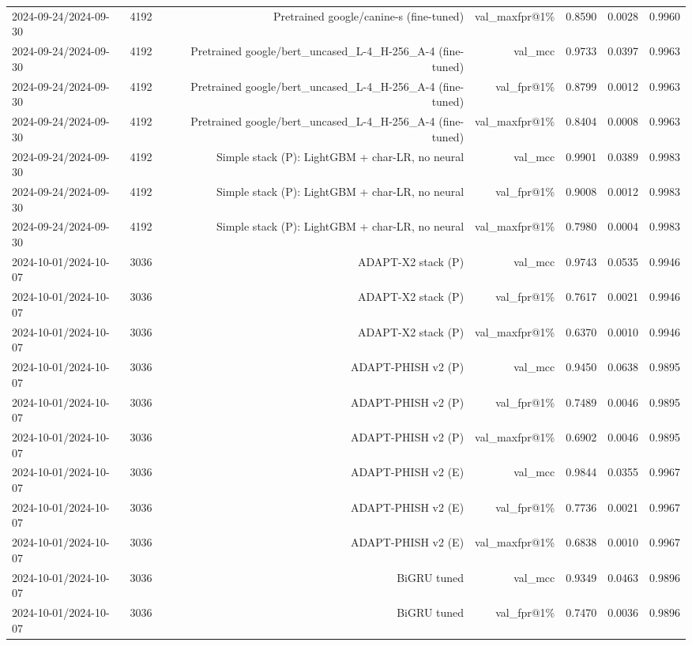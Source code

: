 \begin{table}[t]
\begin{tabular}{llrrrrr}
2024-09-24/2024-09-30 & 4192 & Pretrained google/canine-s (fine-tuned) & val\_maxfpr@1\% & 0.8590 & 0.0028 & 0.9960 \\
2024-09-24/2024-09-30 & 4192 & Pretrained google/bert\_uncased\_L-4\_H-256\_A-4 (fine-tuned) & val\_mcc & 0.9733 & 0.0397 & 0.9963 \\
2024-09-24/2024-09-30 & 4192 & Pretrained google/bert\_uncased\_L-4\_H-256\_A-4 (fine-tuned) & val\_fpr@1\% & 0.8799 & 0.0012 & 0.9963 \\
2024-09-24/2024-09-30 & 4192 & Pretrained google/bert\_uncased\_L-4\_H-256\_A-4 (fine-tuned) & val\_maxfpr@1\% & 0.8404 & 0.0008 & 0.9963 \\
2024-09-24/2024-09-30 & 4192 & Simple stack (P): LightGBM + char-LR, no neural & val\_mcc & 0.9901 & 0.0389 & 0.9983 \\
2024-09-24/2024-09-30 & 4192 & Simple stack (P): LightGBM + char-LR, no neural & val\_fpr@1\% & 0.9008 & 0.0012 & 0.9983 \\
2024-09-24/2024-09-30 & 4192 & Simple stack (P): LightGBM + char-LR, no neural & val\_maxfpr@1\% & 0.7980 & 0.0004 & 0.9983 \\
2024-10-01/2024-10-07 & 3036 & ADAPT-X2 stack (P) & val\_mcc & 0.9743 & 0.0535 & 0.9946 \\
2024-10-01/2024-10-07 & 3036 & ADAPT-X2 stack (P) & val\_fpr@1\% & 0.7617 & 0.0021 & 0.9946 \\
2024-10-01/2024-10-07 & 3036 & ADAPT-X2 stack (P) & val\_maxfpr@1\% & 0.6370 & 0.0010 & 0.9946 \\
2024-10-01/2024-10-07 & 3036 & ADAPT-PHISH v2 (P) & val\_mcc & 0.9450 & 0.0638 & 0.9895 \\
2024-10-01/2024-10-07 & 3036 & ADAPT-PHISH v2 (P) & val\_fpr@1\% & 0.7489 & 0.0046 & 0.9895 \\
2024-10-01/2024-10-07 & 3036 & ADAPT-PHISH v2 (P) & val\_maxfpr@1\% & 0.6902 & 0.0046 & 0.9895 \\
2024-10-01/2024-10-07 & 3036 & ADAPT-PHISH v2 (E) & val\_mcc & 0.9844 & 0.0355 & 0.9967 \\
2024-10-01/2024-10-07 & 3036 & ADAPT-PHISH v2 (E) & val\_fpr@1\% & 0.7736 & 0.0021 & 0.9967 \\
2024-10-01/2024-10-07 & 3036 & ADAPT-PHISH v2 (E) & val\_maxfpr@1\% & 0.6838 & 0.0010 & 0.9967 \\
2024-10-01/2024-10-07 & 3036 & BiGRU tuned & val\_mcc & 0.9349 & 0.0463 & 0.9896 \\
2024-10-01/2024-10-07 & 3036 & BiGRU tuned & val\_fpr@1\% & 0.7470 & 0.0036 & 0.9896 \\

\end{tabular}
\end{table}
